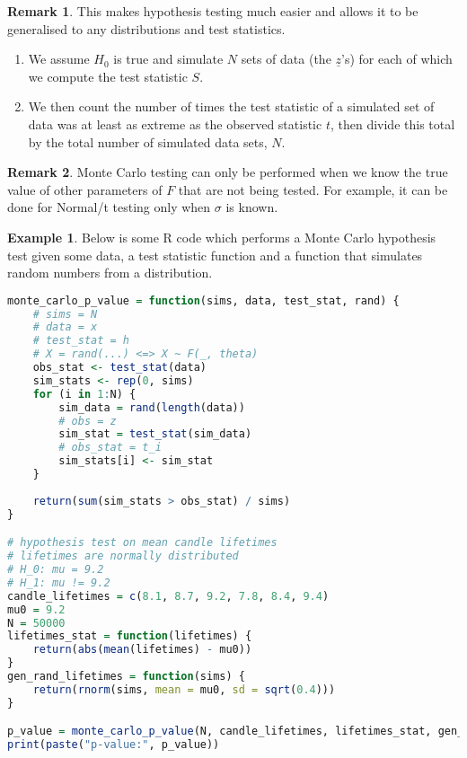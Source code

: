 \documentclass[12pt,a4paper]{article}
\theoremstyle{definition}
\newtheorem{example}[definition]{Example}
\newtheorem*{remark}{Remark}
\begin{document}
\begin{remark}
	This makes hypothesis testing much easier and allows it to be generalised to any distributions and test statistics.

	\begin{enumerate}
		\item We assume $H_0$ is true and simulate $N$ sets of data (the $\underline{z}$'s) for each of which we compute the test statistic $S$.
		\item We then count the number of times the test statistic of a simulated set of data was at least as extreme as the observed statistic $t$, then divide this total by the total number of simulated data sets, $N$.
	\end{enumerate}
\end{remark}

\begin{remark}
	Monte Carlo testing can only be performed when we know the true value of other parameters of $F$ that are not being tested. For example, it can be done for Normal/t testing only when $\sigma$ is known.
\end{remark}

\begin{example}
	Below is some R code which performs a Monte Carlo hypothesis test given some data, a test statistic function and a function that simulates random numbers from a distribution.

	\begin{lstlisting}[language=R]
monte_carlo_p_value = function(sims, data, test_stat, rand) {
	# sims = N
	# data = x
	# test_stat = h
	# X = rand(...) <=> X ~ F(_, theta)
	obs_stat <- test_stat(data)
	sim_stats <- rep(0, sims)
	for (i in 1:N) {
		sim_data = rand(length(data))
		# obs = z
		sim_stat = test_stat(sim_data)
		# obs_stat = t_i
		sim_stats[i] <- sim_stat
	}
	
	return(sum(sim_stats > obs_stat) / sims)
}

# hypothesis test on mean candle lifetimes
# lifetimes are normally distributed
# H_0: mu = 9.2
# H_1: mu != 9.2
candle_lifetimes = c(8.1, 8.7, 9.2, 7.8, 8.4, 9.4)
mu0 = 9.2
N = 50000
lifetimes_stat = function(lifetimes) {
	return(abs(mean(lifetimes) - mu0))
}
gen_rand_lifetimes = function(sims) {
	return(rnorm(sims, mean = mu0, sd = sqrt(0.4)))
}

p_value = monte_carlo_p_value(N, candle_lifetimes, lifetimes_stat, gen_rand_lifetimes)
print(paste("p-value:", p_value))
	\end{lstlisting}
\end{example}
\end{document}
